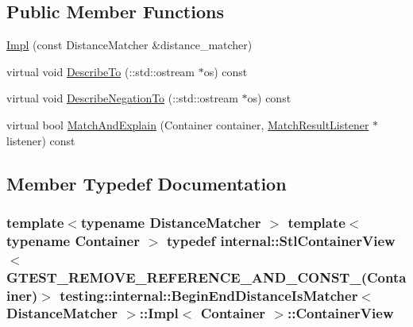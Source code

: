 \subsection*{Public Member Functions}
\begin{DoxyCompactItemize}
\item 
\hyperlink{classtesting_1_1internal_1_1BeginEndDistanceIsMatcher_1_1Impl_a92f5afc23d317260d4a5bd091d2904a4}{Impl} (const Distance\+Matcher \&distance\+\_\+matcher)
\item 
virtual void \hyperlink{classtesting_1_1internal_1_1BeginEndDistanceIsMatcher_1_1Impl_a623f029822276ab759b312519774e993}{Describe\+To} (\+::std\+::ostream $\ast$os) const 
\item 
virtual void \hyperlink{classtesting_1_1internal_1_1BeginEndDistanceIsMatcher_1_1Impl_a7e2a6ddef3dd17a343b8dca9ec93adb7}{Describe\+Negation\+To} (\+::std\+::ostream $\ast$os) const 
\item 
virtual bool \hyperlink{classtesting_1_1internal_1_1BeginEndDistanceIsMatcher_1_1Impl_a78763d6532f99d794f7e952076eb8e02}{Match\+And\+Explain} (Container container, \hyperlink{classtesting_1_1MatchResultListener}{Match\+Result\+Listener} $\ast$listener) const 
\end{DoxyCompactItemize}


\subsection{Member Typedef Documentation}
\subsubsection[{\texorpdfstring{Container\+View}{ContainerView}}]{\setlength{\rightskip}{0pt plus 5cm}template$<$typename Distance\+Matcher $>$ template$<$typename Container $>$ typedef {\bf internal\+::\+Stl\+Container\+View}$<$ {\bf G\+T\+E\+S\+T\+\_\+\+R\+E\+M\+O\+V\+E\+\_\+\+R\+E\+F\+E\+R\+E\+N\+C\+E\+\_\+\+A\+N\+D\+\_\+\+C\+O\+N\+S\+T\+\_\+}(Container)$>$ {\bf testing\+::internal\+::\+Begin\+End\+Distance\+Is\+Matcher}$<$ Distance\+Matcher $>$\+::{\bf Impl}$<$ Container $>$\+::{\bf Container\+View}}\hypertarget{classtesting_1_1internal_1_1BeginEndDistanceIsMatcher_1_1Impl_a5c76ede38c6143430f56e02e9024f535}{}\label{classtesting_1_1internal_1_1BeginEndDistanceIsMatcher_1_1Impl_a5c76ede38c6143430f56e02e9024f535}
